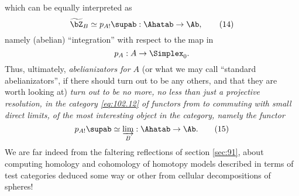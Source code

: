 which can be equally interpreted as
\begin{equation}
  \label{eq:102.14}
  \widetilde \bZ_B \simeq p_{A!}\supab : \Ahatab \to \Ab,\tag{14}
\end{equation}
namely (abelian) ``integration'' with respect to the map in \Cat
\[p_A:A\to\Simplex_0.\]
Thus, ultimately, \emph{abelianizators for $A$} (or what we may call
``standard abelianizators'', if there should turn out to be any
others, and that they are worth looking at) \emph{turn out to be no
  more, no less than just a projective resolution, in the category
  \eqref{eq:102.12} of functors from \Ahatab{} to \Ab{} commuting with
  small direct limits, of the most interesting object in the category,
  namely the functor}
\begin{equation}
  \label{eq:102.15}
  p_{A!}\supab \simeq \varinjlim_B : \Ahatab\to\Ab.\tag{15}
\end{equation}
We are far indeed from the faltering reflections of section
\ref{sec:91}, about computing homology and cohomology of homotopy
models described in terms of test categories deduced some way or other
from cellular decompositions of spheres!

\bigbreak

\noindent\hfill{}\par

